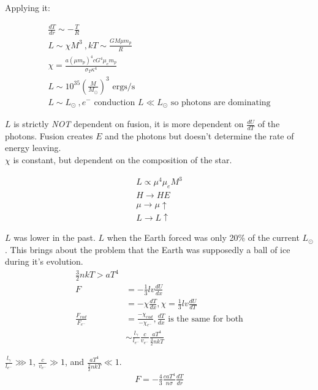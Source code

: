 \documentclass[10pt,letterpaper,final]{book}
\newcommand{\pt}{\propto}
\newcommand{\rp}{\right)}
\newcommand{\lp}{\left(}
\begin{document}
Applying it:

\begin{align}
\frac{dT}{dr} \sim -\frac{T}{R}\\
L \sim \chi M^3~, kT \sim \frac{GM \mu m_p}{R}\\
\chi = \frac{a (\mu m_p)^4 cG^4 \mu_e m_p}{\sigma_T \kappa^4}\\
L \sim 10^{35} \lp \frac{M}{M_\odot} \rp ^3 \text{ ergs/s}\\
L \sim L_\odot~,e^- \text{ conduction $L \ll L_\odot$ so photons are dominating}
\end{align}

$L$ is strictly \textit{NOT} dependent on fusion, it is more dependent on $\frac{dU}{dT}$ of the photons. Fusion creates $E$ and the photons but doesn't determine the rate of energy leaving.\\
$\chi$ is constant, but dependent on the composition of the star. 

\begin{align}
L \pt \mu^4 \mu_e M^3\\
H \rightarrow HE\\
\mu \rightarrow \mu \uparrow\\
L \rightarrow L \uparrow
\end{align}

$L$ was lower in the past. $L$ when the Earth forced was only 20\% of the current $L_\odot$. This brings about the problem that the Earth was supposedly a ball of ice during it's evolution. \\

\begin{align}
\frac{3}{2}nkT > aT^4\\
F &= -\frac{1}{3}lv \frac{dU}{dx}\\
&= -\chi \frac{dT}{dx},\chi = \frac{1}{3}lv \frac{dU}{dT}\\
\frac{F_{rad}}{F_{e^-}} &= \frac{-\chi_{rad}}{-\chi_{e^-}}, \frac{dT}{dx}\text{ is the same for both}\\
&\sim \frac{l_\gamma}{l_{e^-} }\frac{ c}{v_{e^-} }\frac{aT^4}{\frac{3}{2}nkT}
\end{align}

$ \frac{l_\gamma}{l_{e^-} } \ggg 1$, $\frac{ c}{v_{e^-}} \gg 1$, and $\frac{aT^4}{\frac{3}{2}nkT} \ll 1$.\\

\begin{align}
F = -\frac{4}{3}\frac{caT^4}{n \sigma} \frac{dT}{dr}
\end{align}
\end{document}
